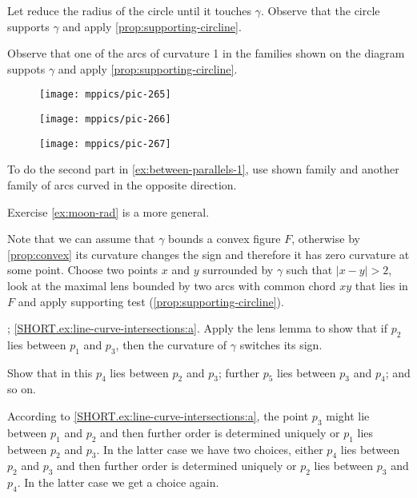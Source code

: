  Let reduce the radius of the circle until it touches $\gamma$.
Observe that the circle supports $\gamma$ and apply \ref{prop:supporting-circline}.


Observe that one of the arcs of curvature 1 in the families shown on the diagram suppots $\gamma$ and apply \ref{prop:supporting-circline}.
\begin{figure}[h!]
\begin{minipage}{.50\textwidth}
\centering
\texttt{[image: mppics/pic-265]}
\end{minipage}\hfill
\begin{minipage}{.26\textwidth}
\centering
\texttt{[image: mppics/pic-266]}
\end{minipage}
\hfill
\begin{minipage}{.20\textwidth}
\centering
\texttt{[image: mppics/pic-267]}
\end{minipage}
\end{figure}
To do the second part in \ref{ex:between-parallels-1}, use shown family and another family of arcs curved in the opposite direction.

Exercise \ref{ex:moon-rad} is a more general. 

Note that we can assume that $\gamma$ bounds a convex figure $F$, otherwise by \ref{prop:convex} its curvature changes the sign and therefore it has zero curvature at some point.
Choose two points $x$ and $y$ surrounded by $\gamma$ such that $|x-y|>2$,
look at the maximal lens bounded by two arcs with common chord $xy$ that lies in $F$ and apply supporting test (\ref{prop:supporting-circline}).

\parbf{\ref{ex:line-curve-intersections}}; \ref{SHORT.ex:line-curve-intersections:a}.
Apply the lens lemma to show that if $p_2$ lies between $p_1$ and $p_3$, then the curvature of $\gamma$ switches its sign.

 Show that in this $p_4$ lies between $p_2$ and $p_3$;
further $p_5$ lies between $p_3$ and $p_4$;
and so on.

According to \ref{SHORT.ex:line-curve-intersections:a}, the point $p_3$ might lie between $p_1$ and $p_2$ and then further order is determined uniquely or $p_1$ lies between $p_2$ and $p_3$.
In the latter case we have two choices, either $p_4$ lies between $p_2$ and $p_3$ and then further order is determined uniquely or $p_2$ lies between $p_3$ and $p_4$.
In the latter case we get a choice again.

